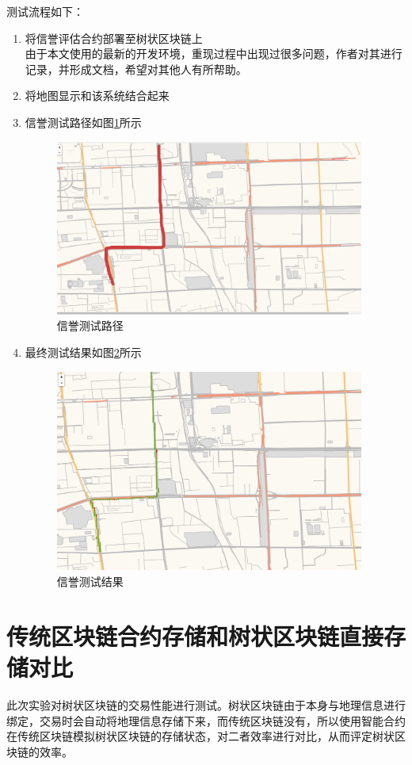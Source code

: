 测试流程如下：
\begin{enumerate}
    \item 将信誉评估合约部署至树状区块链上 \\
    由于本文使用的最新的开发环境，重现过程中出现过很多问题，作者对其进行记录，并形成文档，希望对其他人有所帮助。
    \item 将地图显示和该系统结合起来 
    \item 信誉测试路径如图\ref{信誉测试路径}所示
    \begin{figure}[!htb]
        \centering
        \includegraphics[width=4in]{images/9.png}
        \caption{信誉测试路径}\label{信誉测试路径} 
    \end{figure}

    \item 最终测试结果如图\ref{信誉测试结果}所示
    \begin{figure}[!htb]
        \centering
        \includegraphics[width=4in]{images/10.png}
        \caption{信誉测试结果}\label{信誉测试结果} 
    \end{figure}
\end{enumerate}

\section{传统区块链合约存储和树状区块链直接存储对比}
此次实验对树状区块链的交易性能进行测试。树状区块链由于本身与地理信息进行绑定，交易时会自动将地理信息存储下来，而传统区块链没有，所以使用智能合约在传统区块链模拟树状区块链的存储状态，对二者效率进行对比，从而评定树状区块链的效率。
